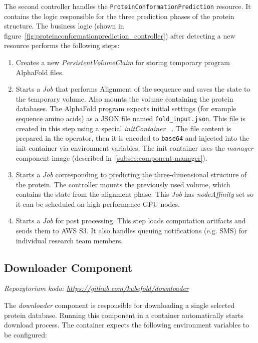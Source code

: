 The second controller handles the \texttt{ProteinConformationPrediction} resource.
It contains the logic responsible for the three prediction phases of the protein structure.
The business logic (shown in figure~\ref{fig:proteinconformationprediction_controller}) after detecting a new resource performs the following steps:
\begin{enumerate}
    \item Creates a new \textit{PersistentVolumeClaim} for storing temporary program AlphaFold files.
    \item Starts a \textit{Job} that performs Alignment of the sequence and saves the state to the temporary volume.
    Also mounts the volume containing the protein databases.
    The AlphaFold program expects initial settings (for example sequence amino acids) as a JSON file named \texttt{fold\_input.json}.
    This file is created in this step using a special \textit{initContainer} ~\cite{k8s_init_containers}.
    The file content is prepared in the operator, then it is encoded to \texttt{base64} and injected into the init container via environment variables.
    The init container uses the \textit{manager} component image (described in~\ref{subsec:component-manager}).
    \item Starts a \textit{Job} corresponding to predicting the three-dimensional structure of the protein.
    The controller mounts the previously used volume, which contains the state from the alignment phase.
    This \textit{Job} has \textit{nodeAffinity} set so it can be scheduled on high-performance GPU nodes.
    \item Starts a \textit{Job} for post processing.
    This step loads computation artifacts and sends them to AWS S3. It also handles queuing notifications (e.g.
    SMS) for individual research team members.
\end{enumerate}

\subsection{Downloader Component}\label{subsec:component-downloader}
\textit{Repozytorium kodu: \url{https://github.com/kubefold/downloader}}

The \textit{downloader} component is responsible for downloading a single selected protein database.
Running this component in a container automatically starts download process.
The container expects the following environment variables to be configured:

